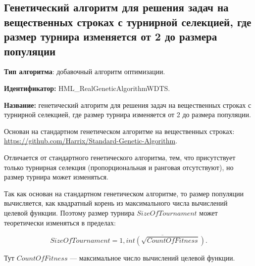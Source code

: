 \subsection{Генетический алгоритм для решения задач на вещественных строках с турнирной селекцией, где размер турнира изменяется от 2 до размера популяции}\label{HarrixOptimizationAlgorithms:HML_RealGeneticAlgorithmWDTS}

\textbf{Тип алгоритма}: добавочный алгоритм оптимизации.

\textbf{Идентификатор:} HML\_RealGeneticAlgorithmWDTS.

\textbf{Название:} генетический алгоритм для решения задач на вещественных строках с турнирной селекцией, где размер турнира изменяется от 2 до размера популяции.

Основан на стандартном генетическом алгоритме на вещественных строках:  \href{https://github.com/Harrix/Standard-Genetic-Algorithm}{https://github.com/Harrix/Standard-Genetic-Algorithm}. 

Отличается от стандартного генетического алгоритма, тем, что присутствует только турнирная селекция (пропорциональная и ранговая отсутствуют), но размер турнира может изменяться.

Так как основан на стандартном генетическом алгоритме, то размер популяции вычисляется, как квадратный корень из максимального числа вычислений целевой функции. Поэтому размер турнира $SizeOfTournament$ может теоретически  изменяться в пределах:

\begin{equation}
SizeOfTournament = \overline{1,int\left( \sqrt{CountOfFitness}\right) }.
\end{equation}

Тут $CountOfFitness$ --- максимальное число вычислений целевой функции.

